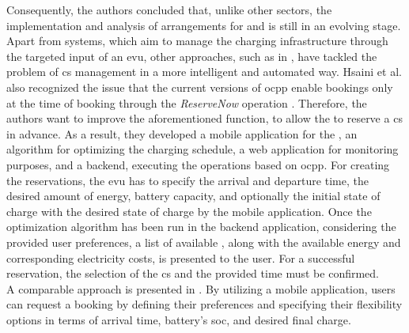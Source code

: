 Consequently, the authors concluded that, unlike other sectors, the implementation and analysis of arrangements for  and  is still in an evolving stage. \\
\noindent Apart from systems, which aim to manage the charging infrastructure through the targeted input of an \acrshort{evu}, other approaches, such as in \cite{hsaini_ocpp-based_2022}, have tackled the problem of \acrshort{cs} management in a more intelligent and automated way.
Hsaini et al. also recognized the issue that the current versions of \acrshort{ocpp} enable bookings only at the time of booking through the \textit{ReserveNow} operation \cite{noauthor_ocpp_nodate,noauthor_ocpp_nodate}.
Therefore, the authors want to improve the aforementioned function, to allow the  to reserve a \acrshort{cs} in advance.
As a result, they developed a mobile application for the , an algorithm for optimizing the charging schedule, a web application for monitoring purposes, and a backend, executing the operations based on \acrshort{ocpp}.
For creating the reservations, the \acrshort{evu} has to specify the arrival and departure time, the desired amount of energy, battery capacity, and optionally the initial state of charge with the desired state of charge by the mobile application.
Once the optimization algorithm has been run in the backend application, considering the provided user preferences, a list of available , along with the available energy and corresponding electricity costs, is presented to the user. For a successful reservation, the selection of the \acrshort{cs} and the provided time must be confirmed. \\
\noindent A comparable approach is presented in \cite{orcioni_ev_2020}. By utilizing a mobile application, users can request a booking by defining their preferences and specifying their flexibility options in terms of arrival time, battery's \acrshort{soc}, and desired final charge.
